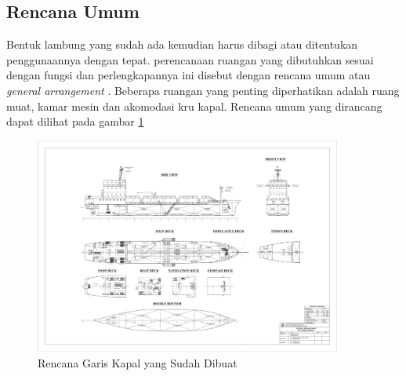 \subsection{Rencana Umum}
\label{subsec:general-arrangement}

Bentuk lambung yang sudah ada kemudian harus dibagi atau ditentukan penggunaannya dengan tepat. perencanaan ruangan yang dibutuhkan sesuai dengan fungsi dan perlengkapannya ini disebut dengan rencana umum atau \emph{general arrangement} \citep{Taggart_1980}. Beberapa ruangan yang penting diperhatikan adalah ruang muat, kamar mesin dan akomodasi kru kapal. Rencana umum yang dirancang dapat dilihat pada gambar \ref{fig:general-arrangement}

\begin{figure}[htbp!]
    \centering
    \includegraphics[width=0.9\textwidth]{gambar/GA 22 Juli 03 45_page-0001(1).jpg}
    \caption{Rencana Garis Kapal yang Sudah Dibuat}
    \label{fig:general-arrangement}
\end{figure}

